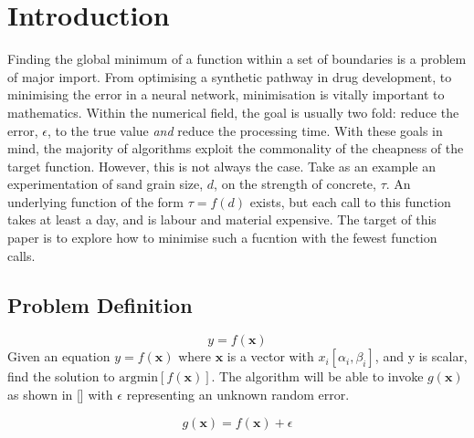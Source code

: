 
\chapter{Introduction}  %

\ifpdf
    \graphicspath{{Chapter1/Figs/Raster/}{Chapter1/Figs/PDF/}{Chapter1/Figs/}}
\else
    \graphicspath{{Chapter1/Figs/Vector/}{Chapter1/Figs/}}
\fi

Finding the global minimum of a function within a set of boundaries is a problem of major import. From optimising a synthetic pathway in drug development, to minimising the error in a neural network, minimisation is vitally important to mathematics. Within the numerical field, the goal is usually two fold: reduce the error, $\epsilon$, to the true value \textit{and} reduce the processing time. With these goals in mind, the majority of algorithms exploit the commonality of the cheapness of the target function. However, this is not always the case. Take as an example an experimentation of sand grain size, $d$, on the strength of concrete, $\tau$. An underlying function of the form $\tau=f(d)$ exists, but each call to this function takes at least a day, and is labour and material expensive. The target of this paper is to explore how to minimise such a fucntion with the fewest function calls.
 
\section{Problem Definition}
\begin{equation}
    y=f(\bm{x})
\end{equation}
Given an equation $y=f(\bm{x})$ where $\bm{x}$ is a vector with $x_i [\alpha_i, \beta_i]$, and y is scalar, find the solution to $\text{argmin}[f(\bm{x})]$. The algorithm will be able to invoke $g(\bm{x})$ as shown in [] with $\epsilon$ representing an unknown random error.

\begin{equation}
    g(\bm{x}) = f(\bm{x}) + \epsilon
\end{equation}

